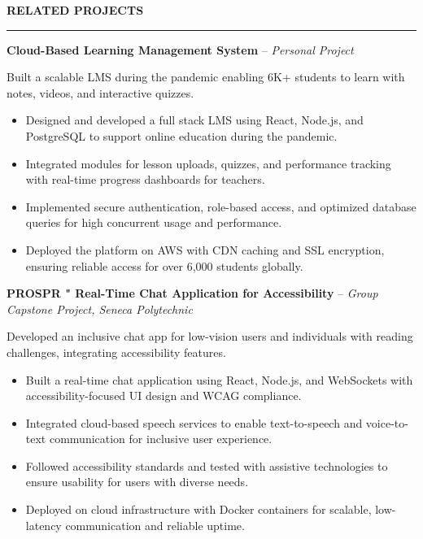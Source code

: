 \documentclass[10pt,letterpaper]{article}
\begin{document}
\vspace{6pt}

\textbf{RELATED PROJECTS}\\[-8pt]
\noindent\rule{\textwidth}{1pt}

\vspace{-2pt}

\textbf{Cloud-Based Learning Management System} -- \emph{Personal Project}

\vspace{-1pt}

Built a scalable LMS during the pandemic enabling 6K+ students to learn with notes, videos, and interactive quizzes.
\vspace{-1pt}
\begin{itemize}
\item Designed and developed a full stack LMS using React, Node.js, and PostgreSQL to support online education during the pandemic.
\item Integrated modules for lesson uploads, quizzes, and performance tracking with real-time progress dashboards for teachers.
\item Implemented secure authentication, role-based access, and optimized database queries for high concurrent usage and performance.
\item Deployed the platform on AWS with CDN caching and SSL encryption, ensuring reliable access for over 6,000 students globally.
\end{itemize}

\textbf{PROSPR " Real-Time Chat Application for Accessibility} -- \emph{Group Capstone Project, Seneca Polytechnic}

\vspace{-1pt}

Developed an inclusive chat app for low-vision users and individuals with reading challenges, integrating accessibility features.
\vspace{-1pt}
\begin{itemize}
\item Built a real-time chat application using React, Node.js, and WebSockets with accessibility-focused UI design and WCAG compliance.
\item Integrated cloud-based speech services to enable text-to-speech and voice-to-text communication for inclusive user experience.
\item Followed accessibility standards and tested with assistive technologies to ensure usability for users with diverse needs.
\item Deployed on cloud infrastructure with Docker containers for scalable, low-latency communication and reliable uptime.
\end{itemize}
\end{document}
